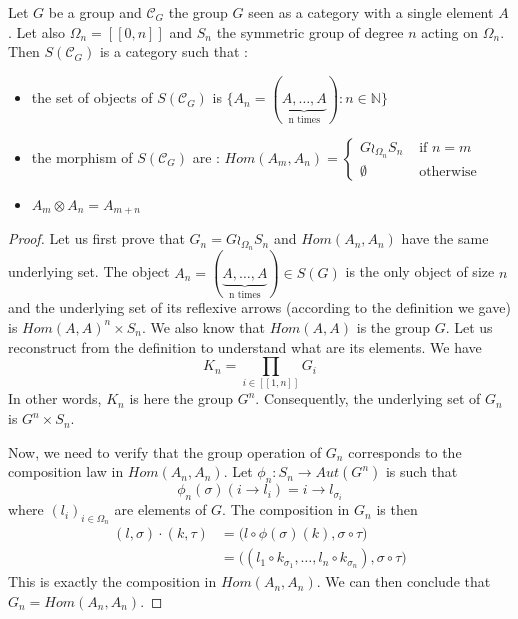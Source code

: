 \documentclass{report}
\begin{document}
\begin{prop}
    Let $G$ be a group and $\mathcal{C}_G$ the group $G$ seen as a category with a single element $A$. Let also $\Omega_n = [\![0,n]\!]$ and $S_n$ the symmetric group of degree $n$ acting on $\Omega_n$. Then $S(\mathcal{C}_G)$ is a category such that :
    \begin{itemize}
        \item the set of objects of $S(\mathcal{C}_G)$ is $\{A_n = (\underbrace{A,\dots,A}_\textrm{n times}) : n\in \mathbb{N}\}$
        \item the morphism of $S(\mathcal{C}_G)$ are : $Hom(A_m,A_n) = \begin{cases}
                      G\wr_{\Omega_n}S_n & \mbox{ if } n = m \\
                      \emptyset          & \mbox{ otherwise}
                  \end{cases}$
        \item $A_m\otimes A_n = A_{m+n}$
    \end{itemize}

\end{prop}

\begin{proof}
    Let us first prove that $G_n = G\wr_{\Omega_n}S_n$ and $Hom(A_n,A_n)$ have the same underlying set.
    The object $A_n = (\underbrace{A,\dots,A}_\textrm{n times})\in S(G)$ is the only object of size $n$ and the underlying set of its reflexive arrows (according to the definition we gave) is $ Hom(A,A)^{n} \times S_n$. We also know that $Hom(A,A)$ is the group $G$.
    Let us reconstruct from the definition to understand what are its elements.
    We have $$K_n = \prod_{i\in [\![1,n]\!]}G_i$$
    In other words, $K_n$ is here the group $G^n$. Consequently, the underlying set of $G_n$ is $G^n\times S_n$.
    \vspace{0.5cm}

    Now, we need to verify that the group operation of $G_n$ corresponds to the composition law in $Hom(A_n,A_n)$.
    Let $\phi_n : S_n \rightarrow Aut(G^n)$ is such that $$\phi_n(\sigma)(i\rightarrow l_i) = i \rightarrow l_{\sigma_i}$$ where $(l_i)_{i\in \Omega_n}$ are elements of $G$. The composition in $G_n$ is then
    \begin{align*}
        (l,\sigma)\cdot (k,\tau) & = \big(l\circ \phi(\sigma)(k),\sigma\circ\tau\big)                                 \\
                                 & = \big((l_1 \circ k_{\sigma_1},\dots, l_n \circ k_{\sigma_n}),\sigma\circ\tau\big)
    \end{align*}
    This is exactly the composition in $Hom(A_n,A_n)$. We can then conclude that $G_n = Hom(A_n,A_n)$.

\end{proof}
\end{document}
